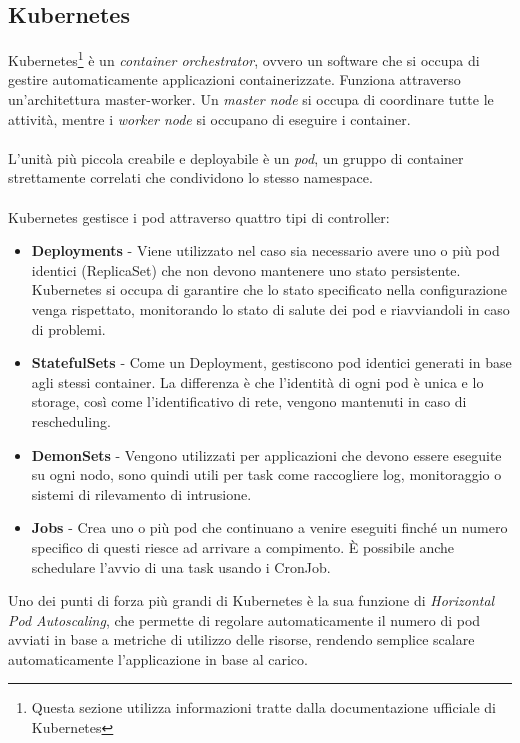 \subsection{Kubernetes}
Kubernetes\footnote{Questa sezione utilizza informazioni tratte dalla documentazione ufficiale di Kubernetes\cite{kubernetesdocs}}
\`e un \textit{container orchestrator}, ovvero un software che si occupa di gestire automaticamente applicazioni containerizzate.
Funziona attraverso un'architettura master-worker. Un \textit{master node} si occupa di coordinare tutte le attivit\`a, mentre i \textit{worker node} si occupano di eseguire i container.
\\\\
L'unit\`a pi\`u piccola creabile e deployabile \`e un \textit{pod}, un gruppo di container strettamente correlati che condividono lo stesso namespace.
\\\\
Kubernetes gestisce i pod attraverso quattro tipi di controller:
\begin{itemize}
  \item \textbf{Deployments} - Viene utilizzato nel caso sia necessario avere uno o pi\`u pod identici (ReplicaSet) che non devono mantenere uno stato persistente. Kubernetes si occupa
    di garantire che lo stato specificato nella configurazione venga rispettato, monitorando lo stato di salute dei pod e riavviandoli in caso di problemi.
  \item \textbf{StatefulSets} - Come un Deployment, gestiscono pod identici generati in base agli stessi container. La differenza è che l'identità di ogni pod è unica e lo storage, così come l'identificativo di rete,
    vengono mantenuti in caso di rescheduling.
  \item \textbf{DemonSets} - Vengono utilizzati per applicazioni che devono essere eseguite su ogni nodo, sono quindi utili per task come raccogliere log, monitoraggio o sistemi di rilevamento di intrusione.
  \item \textbf{Jobs} - Crea uno o pi\`u pod che continuano a venire eseguiti finch\'e un numero specifico di questi riesce ad arrivare a compimento. \`E possibile anche schedulare l'avvio di
    una task usando i CronJob.
\end{itemize}
Uno dei punti di forza pi\`u grandi di Kubernetes \`e la sua funzione di \textit{Horizontal Pod Autoscaling}, che permette di regolare automaticamente il numero di pod avviati in base a
metriche di utilizzo delle risorse, rendendo semplice scalare automaticamente l'applicazione in base al carico.
